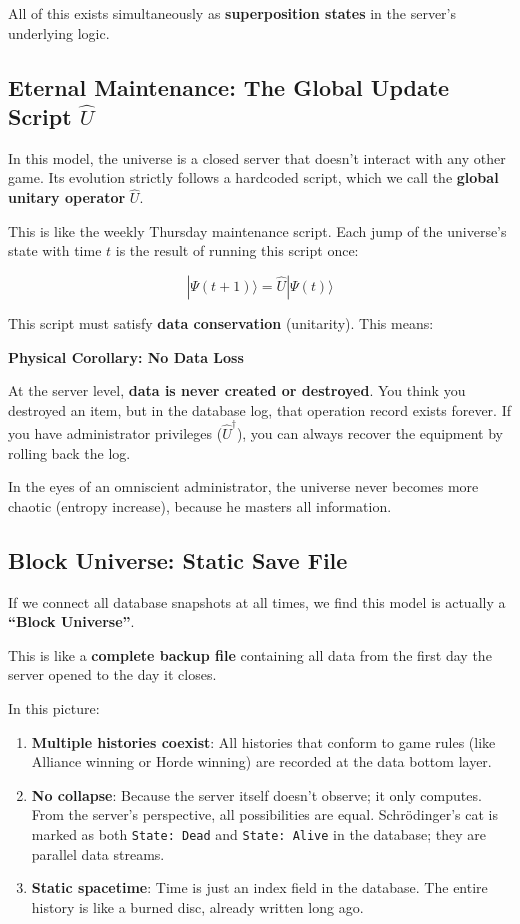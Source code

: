 All of this exists simultaneously as \textbf{superposition states} in the server's underlying logic.

\subsection{Eternal Maintenance: The Global Update Script $\hat{U}$}

In this model, the universe is a closed server that doesn't interact with any other game. Its evolution strictly follows a hardcoded script, which we call the \textbf{global unitary operator} $\hat{U}$.

This is like the weekly Thursday maintenance script. Each jump of the universe's state with time $t$ is the result of running this script once:

\[
|\Psi(t+1)\rangle = \hat{U} |\Psi(t)\rangle
\]

This script must satisfy \textbf{data conservation} (unitarity). This means:

\textbf{Physical Corollary: No Data Loss}

At the server level, \textbf{data is never created or destroyed}. You think you destroyed an item, but in the database log, that operation record exists forever. If you have administrator privileges ($\hat{U}^\dagger$), you can always recover the equipment by rolling back the log.

In the eyes of an omniscient administrator, the universe never becomes more chaotic (entropy increase), because he masters all information.

\subsection{Block Universe: Static Save File}

If we connect all database snapshots at all times, we find this model is actually a \textbf{``Block Universe''}.

This is like a \textbf{complete backup file} containing all data from the first day the server opened to the day it closes.

In this picture:

\begin{enumerate}
\item \textbf{Multiple histories coexist}: All histories that conform to game rules (like Alliance winning or Horde winning) are recorded at the data bottom layer.
\item \textbf{No collapse}: Because the server itself doesn't observe; it only computes. From the server's perspective, all possibilities are equal. Schrödinger's cat is marked as both \texttt{State: Dead} and \texttt{State: Alive} in the database; they are parallel data streams.
\item \textbf{Static spacetime}: Time is just an index field in the database. The entire history is like a burned disc, already written long ago.
\end{enumerate}

